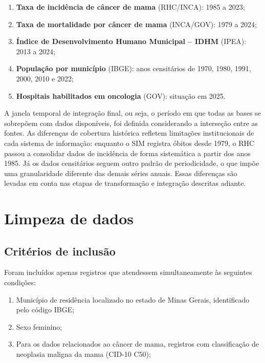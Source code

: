 \begin{enumerate}
    \item \textbf{Taxa de incidência de câncer de mama} (RHC/INCA): 1985 a 2023;
    \item \textbf{Taxa de mortalidade por câncer de mama} (INCA/GOV): 1979 a 2024;
    \item \textbf{Índice de Desenvolvimento Humano Municipal -- IDHM} (IPEA): 2013 a 2024;
    \item \textbf{População por município} (IBGE): anos censitários de 1970, 1980, 1991, 2000, 2010 e 2022;
    \item \textbf{Hospitais habilitados em oncologia} (GOV): situação em 2025.
\end{enumerate}

A janela temporal de integração final, ou seja, o período em que todas as bases se sobrepõem com dados disponíveis, foi definida considerando a interseção entre as fontes. As diferenças de cobertura histórica refletem limitações institucionais de cada sistema de informação: enquanto o SIM registra óbitos desde 1979, o RHC passou a consolidar dados de incidência de forma sistemática a partir dos anos 1985. Já os dados censitários seguem outro padrão de periodicidade, o que impõe uma granularidade diferente das demais séries anuais. Essas diferenças são levadas em conta nas etapas de transformação e integração descritas adiante.

\section{Limpeza de dados}

\subsection{Critérios de inclusão}

Foram incluídos apenas registros que atendessem simultaneamente às seguintes condições:

\begin{enumerate}
    \item Município de residência localizado no estado de Minas Gerais, identificado pelo código IBGE;
    \item Sexo feminino;
    \item Para os dados relacionados ao câncer de mama, registros com classificação de neoplasia maligna da mama (CID-10 C50);
\end{enumerate}

